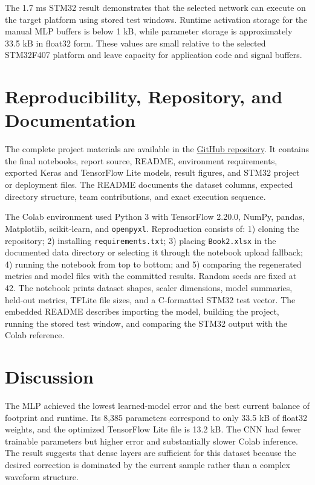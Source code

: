 \documentclass[conference]{IEEEtran}
\newcommand{\RepoURL}{https://github.com/JSMultani/CS-EE-5841-Final-Project}
\begin{document}
The 1.7 ms STM32 result demonstrates that the selected network can execute on the target platform using stored test windows. Runtime activation storage for the manual MLP buffers is below 1 kB, while parameter storage is approximately 33.5 kB in float32 form. These values are small relative to the selected STM32F407 platform and leave capacity for application code and signal buffers.

\section{Reproducibility, Repository, and Documentation}
The complete project materials are available in the \href{\RepoURL}{GitHub repository}. It contains the final notebooks, report source, README, environment requirements, exported Keras and TensorFlow Lite models, result figures, and STM32 project or deployment files. The README documents the dataset columns, expected directory structure, team contributions, and exact execution sequence.

The Colab environment used Python 3 with TensorFlow 2.20.0, NumPy, pandas, Matplotlib, scikit-learn, and \texttt{openpyxl}. Reproduction consists of: 1) cloning the repository; 2) installing \texttt{requirements.txt}; 3) placing \texttt{Book2.xlsx} in the documented data directory or selecting it through the notebook upload fallback; 4) running the notebook from top to bottom; and 5) comparing the regenerated metrics and model files with the committed results. Random seeds are fixed at 42. The notebook prints dataset shapes, scaler dimensions, model summaries, held-out metrics, TFLite file sizes, and a C-formatted STM32 test vector. The embedded README describes importing the model, building the project, running the stored test window, and comparing the STM32 output with the Colab reference.

\section{Discussion}
\label{sec:discussion}
The MLP achieved the lowest learned-model error and the best current balance of footprint and runtime. Its 8,385 parameters correspond to only 33.5 kB of float32 weights, and the optimized TensorFlow Lite file is 13.2 kB. The CNN had fewer trainable parameters but higher error and substantially slower Colab inference. The result suggests that dense layers are sufficient for this dataset because the desired correction is dominated by the current sample rather than a complex waveform structure.
\end{document}
